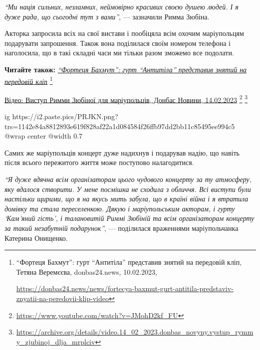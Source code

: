 \begin{leftbar}
\emph{\enquote{Ми нація сильних, незламних, неймовірно красивих своєю душею людей. І
я дуже рада, що сьогодні тут з вами}}, — зазначили Римма Зюбіна.
\end{leftbar}


Акторка запросила всіх на свої вистави і пообіцяла всім охочим маріупольцям
подарувати запрошення. Також вона поділилася своїм номером телефона і
наголосила, що в такі складні часи ми тільки разом зможемо все подолати.

\textbf{Читайте також:} \href{https://donbas24.news/news/fortecya-baxmut-gurt-antitila-predstaviv-znyatii-na-peredovii-klip-video}{\emph{\enquote{Фортеця Бахмут}: гурт \enquote{Антитіла} представив знятий на передовій кліп}}%
\footnote{\enquote{Фортеця Бахмут}: гурт \enquote{Антитіла} представив знятий на передовій кліп, Тетяна Веремєєва, donbas24.news, 10.02.2023, \par%
\url{https://donbas24.news/news/fortecya-baxmut-gurt-antitila-predstaviv-znyatii-na-peredovii-klip-video}%
}

\href{https://archive.org/details/video.14_02_2023.donbas_novyny.vystup_rymmy_zjubinoj_dlja_mrplciv}{%
Відео: Виступ Римми Зюбіної для маріупольців, Донбас Новини, 14.02.2023}%
\footnote{\url{https://www.youtube.com/watch?v=JMohD2kf_FU}} %
\footnote{\url{https://archive.org/details/video.14_02_2023.donbas_novyny.vystup_rymmy_zjubinoj_dlja_mrplciv}}

\ifcmt
  ig https://i2.paste.pics/PRJKN.png?trs=1142e84a8812893e619f828af22a1d084584f26ffb97dd2bb11c85495ee994c5
  @wrap center
  @width 0.7
\fi

Самих же маріупольців концерт дуже надихнув і подарував надію, що навіть після
всього пережитого життя може поступово налагодитися.

\begin{leftbar}
\emph{\enquote{Я дуже вдячна всім організаторам цього чудового концерту за ту атмосферу,
яку вдалося створити. У мене посмішка не сходила з обличчя. Всі виступи
були настільки щирими, що я на якусь мить забула, що в країні війна і я
втратила домівку та стала переселенкою. Дякую і маріупольським акторам,
і гурту \enquote{Кам'яний гість}, і талановитій Риммі Зюбіній та всім
організаторам концерту за такий незабутній подарунок}}, — поділилася
враженнями маріупольчанка Катерина Онищенко.
\end{leftbar}

